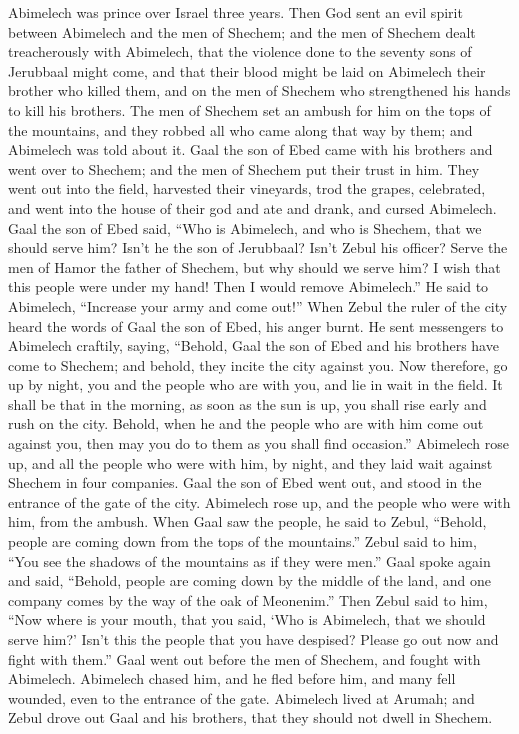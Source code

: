  Abimelech was prince over Israel three years.
 Then God sent an evil spirit between Abimelech and the
men of Shechem; and the men of Shechem dealt treacherously with
Abimelech,  that the violence done to the seventy sons of
Jerubbaal might come, and that their blood might be laid on Abimelech
their brother who killed them, and on the men of Shechem who
strengthened his hands to kill his brothers.  The men of
Shechem set an ambush for him on the tops of the mountains, and they
robbed all who came along that way by them; and Abimelech was told about
it.  Gaal the son of Ebed came with his brothers and went
over to Shechem; and the men of Shechem put their trust in him.
 They went out into the field, harvested their vineyards,
trod the grapes, celebrated, and went into the house of their god and
ate and drank, and cursed Abimelech.  Gaal the son of
Ebed said, ``Who is Abimelech, and who is Shechem, that we should serve
him? Isn't he the son of Jerubbaal? Isn't Zebul his officer? Serve the
men of Hamor the father of Shechem, but why should we serve him?
 I wish that this people were under my hand! Then I would
remove Abimelech.'' He said to Abimelech, ``Increase your army and come
out!''  When Zebul the ruler of the city heard the words
of Gaal the son of Ebed, his anger burnt.  He sent
messengers to Abimelech craftily, saying, ``Behold, Gaal the son of Ebed
and his brothers have come to Shechem; and behold, they incite the city
against you.  Now therefore, go up by night, you and the
people who are with you, and lie in wait in the field. 
It shall be that in the morning, as soon as the sun is up, you shall
rise early and rush on the city. Behold, when he and the people who are
with him come out against you, then may you do to them as you shall find
occasion.''  Abimelech rose up, and all the people who
were with him, by night, and they laid wait against Shechem in four
companies.  Gaal the son of Ebed went out, and stood in
the entrance of the gate of the city. Abimelech rose up, and the people
who were with him, from the ambush.  When Gaal saw the
people, he said to Zebul, ``Behold, people are coming down from the tops
of the mountains.'' Zebul said to him, ``You see the shadows of the
mountains as if they were men.''  Gaal spoke again and
said, ``Behold, people are coming down by the middle of the land, and
one company comes by the way of the oak of Meonenim.'' 
Then Zebul said to him, ``Now where is your mouth, that you said, `Who
is Abimelech, that we should serve him?' Isn't this the people that you
have despised? Please go out now and fight with them.'' 
Gaal went out before the men of Shechem, and fought with Abimelech.
 Abimelech chased him, and he fled before him, and many
fell wounded, even to the entrance of the gate. 
Abimelech lived at Arumah; and Zebul drove out Gaal and his brothers,
that they should not dwell in Shechem.

